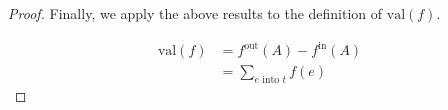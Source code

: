 \documentclass[letterpaper,11pt]{article}
\newcommand{\val}{\!\mathrm{val}}
\begin{document}
\begin{description}
\begin{proof}
            Finally, we apply the above results to the definition of
            $\val{(f)}$.

            \begin{align*}
                \val{(f)} &= f^\mathrm{out}(A) - f^\mathrm{in}(A) \\
                          &= \sum_{e \text{ into } t} f(e)
            \end{align*}

        \end{proof}


\end{description}
\end{document}
